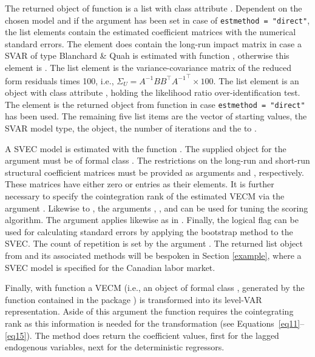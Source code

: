 \documentclass[nojss]{jss}
\begin{document}
The returned object of function  is a list with class
attribute . Dependent on the chosen model and if the
argument  has been set in case of 
\verb/estmethod = "direct"/, the list elements  contain the
estimated coefficient matrices with the numerical standard errors. The
element  does contain the long-run impact matrix in case a
SVAR of type Blanchard \& Quah is estimated with function ,
otherwise this element is  \citep[see][]{BLA1989}. The list
element  is the variance-covariance matrix of the
reduced form residuals times 100, i.e., $\Sigma_U = A^{-1}BB^\top {A^{-1}}^\top
\times 100$. The list element  is an object with class
attribute , holding the likelihood ratio
over-identification test. The element  is the returned
object from function  in case 
\verb/estmethod = "direct"/ has been used. The remaining five list items are  
the vector of starting values, the SVAR model type, the 
object, the number of iterations and the  to .

A SVEC model is estimated with the function . The
supplied object for the argument  must be of formal class
. The restrictions on the long-run and short-run
structural coefficient matrices must be provided as arguments
 and , respectively. These matrices have either zero
or  entries as their elements. It is further necessary to
specify the cointegration rank of the estimated VECM via the argument
. Likewise to , the arguments , 
,  and  can be used for
tuning the scoring algorithm. The argument  applies
likewise as in . Finally, the logical flag 
can be used for calculating standard errors by applying the bootstrap
method to the SVEC. The count of repetition is set by the argument
. The returned list object from  and its
associated methods will be bespoken in Section \ref{example}, where a
SVEC model is specified for the Canadian labor market.    

Finally, with function  a VECM (i.e., an object of formal
class , generated by the function  contained in the
package ) is transformed into its level-VAR representation. Aside of
this argument the function requires the cointegrating rank as this
information is needed for the transformation (see
Equations~\ref{eq11}--\ref{eq15}). The  method does
return the coefficient values, first for the lagged endogenous
variables, next for the deterministic regressors.
\end{document}
